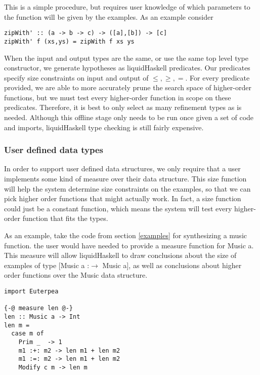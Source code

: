 This is a simple procedure, but requires user knowledge of which parameters to the function will be given by the examples. 
As an example consider 

\begin{lstlisting}
zipWith' :: (a -> b -> c) -> ([a],[b]) -> [c]
zipWith' f (xs,ys) = zipWith f xs ys
\end{lstlisting}


When the input and output types are the same, or use the same top level type constructor, we generate hypotheses as liquidHaskell predicates.
Our predicates specify size constraints on input and output of $\leq,\geq,=$.
For every predicate provided, we are able to more accurately prune the search space of higher-order functions, but we must test every higher-order function in scope on these predicates. 
Therefore, it is best to only select as many refinement types as is needed.
Although this offline stage only needs to be run once given a set of code and imports, liquidHaskell type checking is still fairly expensive.



\subsubsection{User defined data types}
In order to support user defined data structures, we only require that a user implements some kind of measure\cite{realWorldLiquid} over their data structure.
This size function will help the system determine size constraints on the examples, so that we can pick higher order functions that might actually work.
In fact, a size function could just be a constant function, which means the system will test every higher-order function that fits the types. 

As an example, take the code from section \ref{examples} for synthesizing a music function.
the user would have needed to provide a measure function for Music a.
This measure will allow liquidHaskell to draw conclusions about the size of examples of type [Music a :$\to$ Music a], as well as conclusions about higher order functions over the Music data structure.

\begin{lstlisting}
import Euterpea

{-@ measure len @-}
len :: Music a -> Int
len m =
  case m of
    Prim _  -> 1
    m1 :+: m2 -> len m1 + len m2
    m1 :=: m2 -> len m1 + len m2
    Modify c m -> len m
\end{lstlisting}



